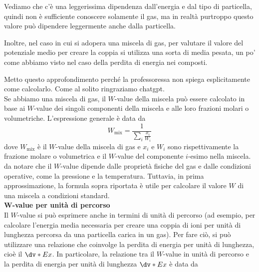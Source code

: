 Vediamo che c'è una leggerissima dipendenza dall'energia e dal tipo di particella, quindi non è sufficiente conoscere solamente il gas, ma in realtà purtroppo questo valore può dipendere leggermente anche dalla particella.

Inoltre, nel caso in cui si adopera una miscela di gas, per valutare il valore del potenziale medio per creare la coppia si utilizza una sorta di media pesata, un po' come abbiamo visto nel caso della perdita di energia nei composti.

\begin{approfondimento}
   \footnotesize
   Metto questo approfondimento perché la professoressa non spiega esplicitamente come calcolarlo. Come al solito ringraziamo chatgpt.\\[0.2cm]
   Se abbiamo una miscela di gas, il $W$-value della miscela può essere calcolato in base ai $W$-value dei singoli componenti della miscela e alle loro frazioni molari o volumetriche. L'espressione generale è data da
   \begin{equation*}
      W_{\text{mix}} = \frac{1}{\sum_i \frac{x_i}{W_i}}
   \end{equation*}
   dove $W_{\text{mix}}$ è il $W$-value della miscela di gas e $x_i$ e $W_i$ sono rispettivamente la frazione molare o volumetrica e il $W$-value del componente $i$-esimo nella miscela.\\
   \E da notare che il $W$-value dipende dalle proprietà fisiche del gas e dalle condizioni operative, come la pressione e la temperatura. Tuttavia, in prima approssimazione, la formula sopra riportata è utile per calcolare il valore $W$ di una miscela a condizioni standard.\\[0.2cm]
   \textbf{$\boldsymbol{W}$-value per unità di percorso}\\
   Il $W$-value si può esprimere anche in termini di unità di percorso (ad esempio, per calcolare l'energia media necessaria per creare una coppia di ioni per unità di lunghezza percorsa da una particella carica in un gas). Per fare ciò, si può utilizzare una relazione che coinvolge la perdita di energia per unità di lunghezza, cioè il $\dv*{E}{x}$. In particolare, la relazione tra il $W$-value in unità di percorso e la perdita di energia per unità di lunghezza $\dv*{E}{x}$ è data da

\end{approfondimento}
